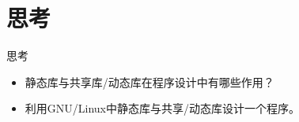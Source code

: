 
\section{思考}
\begin{frame}{思考}
\begin{itemize}
\item 静态库与共享库/动态库在程序设计中有哪些作用？
\item 利用GNU/Linux中静态库与共享/动态库设计一个程序。
\end{itemize}
\end{frame}



